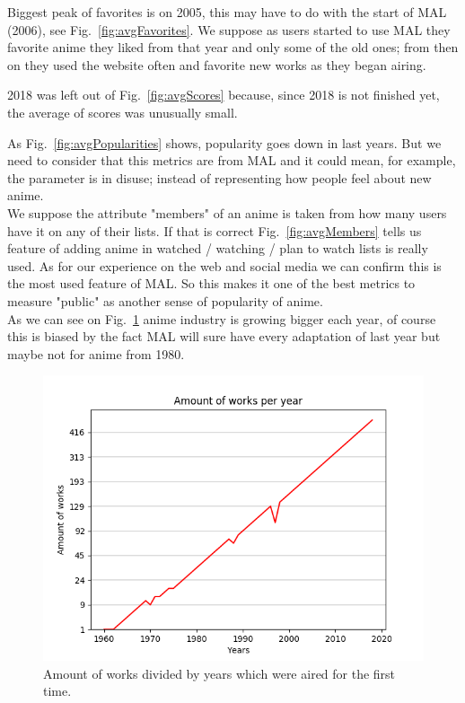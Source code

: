 Biggest peak of favorites is on 2005, this may have to do with the start of MAL (2006), see Fig.~\ref{fig:avgFavorites}. We suppose as users started to use MAL they favorite anime they liked from that year and only some of the old ones; from then on they used the website often and favorite new works as they began airing.

2018 was left out of Fig.~\ref{fig:avgScores} because, since 2018 is not finished yet, the average of scores was unusually small.

As Fig.~\ref{fig:avgPopularities} shows, popularity goes down in last years. But we need to consider that this metrics are from MAL and it could mean, for example, the parameter is in disuse; instead of representing how people feel about new anime.\\

We suppose the attribute "members" of an anime is taken from how many users have it on any of their lists. If that is correct Fig.~\ref{fig:avgMembers} tells us feature of adding anime in watched / watching / plan to watch lists is really used. As for our experience on the web and social media we can confirm this is the most used feature of MAL. So this makes it one of the best metrics to measure "public" as another sense of popularity of anime.\\

As we can see on Fig.~\ref{fig:amountOfWorksPerYear} anime industry is growing bigger each year, of course this is biased by the fact MAL will sure have every adaptation of last year but maybe not for anime from 1980.

\begin{figure}[!h]
	\begin{center}
	\includegraphics[width=\columnwidth]{graphics/worksPerYear_1960-2018.png}
	\caption{Amount of works divided by years which were aired for the first time.}
	\label{fig:amountOfWorksPerYear}
	\end{center}
\end{figure}

